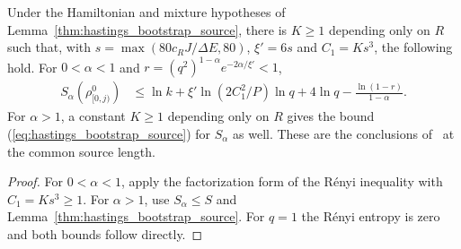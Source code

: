 \begin{lemma}
    \label{thm:hastings_renyi_bootstrap_source}
    \leanok
    Under the Hamiltonian and mixture hypotheses of
    Lemma~\ref{thm:hastings_bootstrap_source}, there is $K\ge1$ depending
    only on $R$ such that, with $s=\max(80c_RJ/\Delta E,80)$,
    $\xi'=6s$ and $C_1=Ks^3$, the following hold.
    For $0<\alpha<1$ and $r=(q^2)^{1-\alpha}e^{-2\alpha/\xi'}<1$,
    \begin{align}
        S_\alpha(\rho^0_{[0,j)})
         & \le\ln k+\xi'\ln(2C_1^2/P)\ln q+4\ln q
        -\frac{\ln(1-r)}{1-\alpha}.
        \label{eq:hastings_renyi_bootstrap_source}
    \end{align}
    For $\alpha>1$, a constant $K\ge1$ depending only on $R$ gives
    the bound (\ref{eq:hastings_bootstrap_source}) for $S_\alpha$ as well.
    These are the conclusions of~\cite[lines 392--410]{Hastings2007AreaLaw}
    at the common source length.
\end{lemma}
\begin{proof}\leanok
    For $0<\alpha<1$, apply the factorization form of the Rényi
    inequality with $C_1=Ks^3\ge1$. For $\alpha>1$, use $S_\alpha\le S$
    and Lemma~\ref{thm:hastings_bootstrap_source}. For $q=1$ the Rényi
    entropy is zero and both bounds follow directly.
\end{proof}
